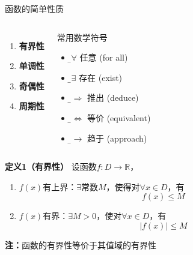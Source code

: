 \begin{frame}{函数的简单性质}
	\linespread{1.5}\pause 
	\begin{columns}
			\begin{enumerate}
			  \item {\bf 有界性}\pause 
			  \item {\bf 单调性}\pause 
			  \item {\bf 奇偶性}\pause 
			  \item {\bf 周期性}\pause 
			\end{enumerate}
			\begin{block}{常用数学符号}
				\begin{itemize}
				  \item {\b$\bm{\forall}$} \quad 任意 (for all) 
				  \item {\b$\bm{\exists}$} \quad 存在 (exist)
				  \item {\b$\bm{\Rightarrow}$} \quad 推出 (deduce)
				  \item {\b$\bm{\Leftrightarrow}$} \quad 等价 (equivalent)
				  \item {\b$\bm{\to}$} \quad 趋于 (approach)
				\end{itemize}
			\end{block}
	\end{columns}
\end{frame}

\begin{frame}
	\linespread{1.4}
	\begin{block}{{\bf 定义1（有界性）}}\pause 
		设函数$f:D\to\mathbb{R}$，
		\begin{enumerate}
		  \item {\bb $f(x)$有上界：}\pause $\exists$常数$M$，\pause 使得对$\forall x\in
		  D$，\pause 有 $$f(x)\leq M$$\pause
		  \vspace{-2em} 
		  \item {\bb $f(x)$有界：}\pause $\exists M>0$，\pause 使对$\forall x\in D$，\pause 有
		  $$|f(x)|\leq M$$
		\end{enumerate}
	\end{block}\pause 
	{\bf 注：}函数的有界性等价于其值域的有界性
\end{frame}

